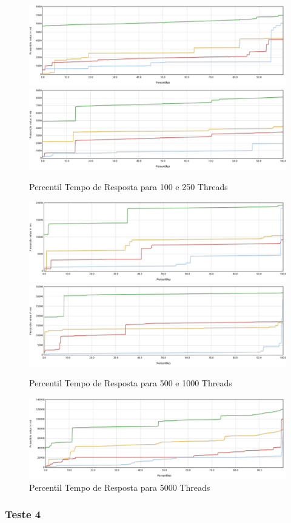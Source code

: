 \begin{figure}[ht!]
    \centering
    \includegraphics[width=.45\linewidth]{img/testes/i-t3-100.png}
    \includegraphics[width=.45\linewidth]{img/testes/i-t3-250.png}
    \caption{Percentil Tempo de Resposta para 100 e 250 Threads}
\end{figure}

\begin{figure}[ht!]
    \centering
    \includegraphics[width=.45\linewidth]{img/testes/i-t3-500.png}
    \includegraphics[width=.45\linewidth]{img/testes/i-t3-1000.png}
    \caption{Percentil Tempo de Resposta para 500 e 1000 Threads}
\end{figure}

\begin{figure}[ht!]
    \centering
    \includegraphics[width=.9\linewidth]{img/testes/i-t3-5000.png}
    \caption{Percentil Tempo de Resposta para 5000 Threads}
\end{figure}

\pagebreak

\subsubsection{Teste 4}

